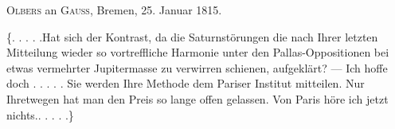 \par{}\bigskip
\begin{center}
\textsc{Olbers} an \textsc{Gauss}, Bremen, 25. Januar 1815.
\end{center}
\noindent\hspace*{\parindent}\{. . . . .\quad Hat sich der Kontrast, da die Saturnstörungen die nach Ihrer letzten Mitteilung wieder so vortreffliche Harmonie unter den Pallas-Oppositionen bei etwas vermehrter Jupitermasse zu verwirren schienen, aufgeklärt? — Ich hoffe doch . . . . . Sie werden Ihre Methode dem Pariser Institut mitteilen. Nur Ihretwegen hat man den Preis so lange offen gelassen. Von Paris höre ich jetzt nichts.\quad . . . . .\}
\par
